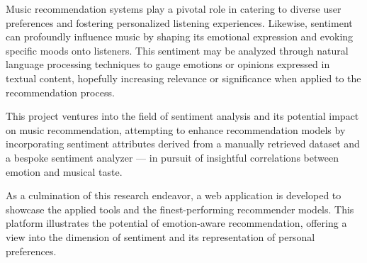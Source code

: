 Music recommendation systems play a pivotal role in catering to diverse user preferences and fostering personalized listening experiences. Likewise, sentiment can profoundly influence music by shaping its emotional expression and evoking specific moods onto listeners. This sentiment may be analyzed through natural language processing techniques to gauge emotions or opinions expressed in textual content, hopefully increasing relevance or significance when applied to the recommendation process.

This project ventures into the field of sentiment analysis and its potential impact on music recommendation, attempting to enhance recommendation models by incorporating sentiment attributes derived from a manually retrieved dataset and a bespoke sentiment analyzer --- in pursuit of insightful correlations between emotion and musical taste.

As a culmination of this research endeavor, a web application is developed to showcase the applied tools and the finest-performing recommender models. This platform illustrates the potential of emotion-aware recommendation, offering a view into the dimension of sentiment and its representation of personal preferences.

